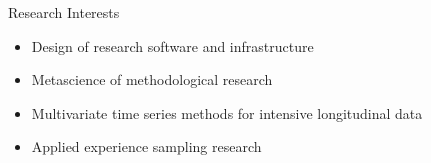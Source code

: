 \documentclass{resume} %
\begin{document}
\pagestyle{plain}
\thispagestyle{plain}




\begin{rSection}{Research Interests}
    \begin{itemize}
        \item Design of research software and infrastructure 
        \item Metascience of methodological research 
        \item Multivariate time series methods for intensive longitudinal data
        \item Applied experience sampling research
    \end{itemize}
\end{rSection}

\end{document}
